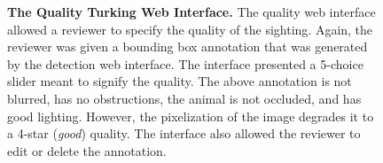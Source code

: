 \begin{figure}[t]%
    \centering
        \caption[The Quality Turking Web Interface]{\textbf{The Quality Turking Web Interface.}  The quality web interface allowed a reviewer to specify the quality of the sighting.  Again, the reviewer was given a bounding box annotation that was generated by the detection web interface.  The interface presented a 5-choice slider meant to signify the quality.  The above annotation is not blurred, has no obstructions, the animal is not occluded, and has good lighting.  However, the pixelization of the image degrades it to a 4-star (\textit{good}) quality.  The interface also allowed the reviewer to edit or delete the annotation.}
        \label{fig:turking_interface_quality}
\end{figure}

